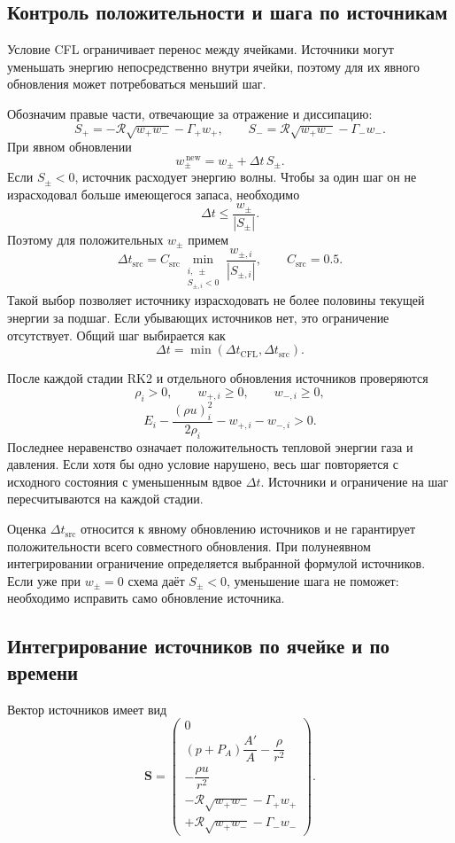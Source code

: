 \documentclass[11pt,a4paper]{article}
\newcommand{\Rref}{\mathcal R}
\newcommand{\Src}{\bm S}
\begin{document}
\subsection{Контроль положительности и шага по источникам}

Условие CFL ограничивает перенос между ячейками.
Источники могут уменьшать энергию непосредственно
внутри ячейки, поэтому для их явного обновления
может потребоваться меньший шаг.

Обозначим правые части, отвечающие за отражение
и диссипацию:
\[
S_+=-\Rref\sqrt{w_+w_-}-\Gamma_+w_+,
\qquad
S_-=\Rref\sqrt{w_+w_-}-\Gamma_-w_-.
\]
При явном обновлении
\[
w_\pm^{\,\mathrm{new}}=w_\pm+\Delta t\,S_\pm.
\]
Если $S_\pm<0$, источник расходует энергию волны.
Чтобы за один шаг он не израсходовал больше
имеющегося запаса, необходимо
\[
\Delta t\leq\frac{w_\pm}{|S_\pm|}.
\]
Поэтому для положительных $w_\pm$ примем
\[
\Delta t_{\mathrm{src}}
=
C_{\mathrm{src}}
\min_{\substack{i,\;\pm\\S_{\pm,i}<0}}
\frac{w_{\pm,i}}{|S_{\pm,i}|},
\qquad C_{\mathrm{src}}=0.5.
\]
Такой выбор позволяет источнику израсходовать
не более половины текущей энергии за подшаг.
Если убывающих источников нет, это ограничение
отсутствует. Общий шаг выбирается как
\[
\Delta t=\min(\Delta t_{\mathrm{CFL}},
             \Delta t_{\mathrm{src}}).
\]

После каждой стадии RK2 и отдельного обновления
источников проверяются
\[
\rho_i>0,\qquad w_{+,i}\geq0,\qquad w_{-,i}\geq0,
\]
\[
E_i-\frac{(\rho u)_i^2}{2\rho_i}
-w_{+,i}-w_{-,i}>0.
\]
Последнее неравенство означает положительность
тепловой энергии газа и давления.
Если хотя бы одно условие нарушено, весь шаг
повторяется с исходного состояния
с уменьшенным вдвое $\Delta t$.
Источники и ограничение на шаг пересчитываются
на каждой стадии.

Оценка $\Delta t_{\mathrm{src}}$ относится
к явному обновлению источников и не гарантирует
положительности всего совместного обновления.
При полунеявном интегрировании ограничение
определяется выбранной формулой источников.
Если уже при $w_\pm=0$ схема даёт $S_\pm<0$,
уменьшение шага не поможет: необходимо исправить
само обновление источника.

\subsection{Интегрирование источников по ячейке и по времени}

Вектор источников имеет вид
\[
\Src=
\begin{pmatrix}
0\\[3pt]
(p+P_A)\dfrac{A'}{A}-\dfrac{\rho}{r^2}\\[7pt]
-\dfrac{\rho u}{r^2}\\[7pt]
-\Rref\sqrt{w_+w_-}-\Gamma_+w_+\\[3pt]
+\Rref\sqrt{w_+w_-}-\Gamma_-w_-
\end{pmatrix}.
\]
\end{document}
